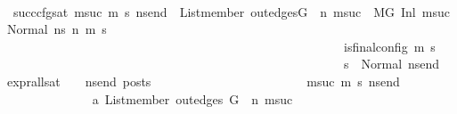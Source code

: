 \begin{isabellebody}
\isanewline
\ \ \ \ \ \ \ \ \ \ \isamarkupfalse%
\ succ{\isacharunderscore}{\kern0pt}cfg{\isacharunderscore}{\kern0pt}sat{\isacharcolon}{\kern0pt}\ {\isachardoublequoteopen}{\isasymAnd}msuc{}\ m{\isacharprime}{\kern0pt}\ s{\isacharprime}{\kern0pt}\ ns{\isacharunderscore}{\kern0pt}end{\isachardot}{\kern0pt}\ \ List{\isachardot}{\kern0pt}member\ {\isacharparenleft}{\kern0pt}out{\isacharunderscore}{\kern0pt}edges{\isacharparenleft}{\kern0pt}G{\isacharparenright}{\kern0pt}\ {\isacharbang}{\kern0pt}\ n{\isacharparenright}{\kern0pt}\ msuc{}\ {\isasymLongrightarrow}\ {\isacharparenleft}{\kern0pt}M{\isacharcomma}{\kern0pt}{\isasymLambda}{\isacharcomma}{\kern0pt}{\isasymGamma}{\isacharcomma}{\kern0pt}{\isasymOmega}{\isacharcomma}{\kern0pt}G\ {\isasymturnstile}{\isacharparenleft}{\kern0pt}Inl\ {\isacharparenleft}{\kern0pt}msuc{}{\isacharparenright}{\kern0pt}{\isacharcomma}{\kern0pt}\ Normal\ ns{}{\isacharparenright}{\kern0pt}\ {\isacharminus}{\kern0pt}n{\isasymrightarrow}{\isacharasterisk}{\kern0pt}\ {\isacharparenleft}{\kern0pt}m{\isacharprime}{\kern0pt}{\isacharcomma}{\kern0pt}\ s{\isacharprime}{\kern0pt}{\isacharparenright}{\kern0pt}{\isacharparenright}{\kern0pt}\ {\isasymLongrightarrow}\isanewline
\ \ \ \ \ \ \ \ \ \ \ \ \ \ \ \ \ \ \ \ \ \ \ \ \ \ \ \ \ \ \ \ \ \ \ \ \ \ \ \ \ \ \ \ \ \ \ \ \ \ \ \ \ \ is{\isacharunderscore}{\kern0pt}final{\isacharunderscore}{\kern0pt}config\ {\isacharparenleft}{\kern0pt}m{\isacharprime}{\kern0pt}{\isacharcomma}{\kern0pt}\ s{\isacharprime}{\kern0pt}{\isacharparenright}{\kern0pt}\ {\isasymLongrightarrow}\ \isanewline
\ \ \ \ \ \ \ \ \ \ \ \ \ \ \ \ \ \ \ \ \ \ \ \ \ \ \ \ \ \ \ \ \ \ \ \ \ \ \ \ \ \ \ \ \ \ \ \ \ \ \ \ \ \ {\isacharparenleft}{\kern0pt}s{\isacharprime}{\kern0pt}\ {\isacharequal}{\kern0pt}\ Normal\ ns{\isacharunderscore}{\kern0pt}end{\isacharparenright}{\kern0pt}\ {\isasymlongrightarrow}\ {\isacharparenleft}{\kern0pt}expr{\isacharunderscore}{\kern0pt}all{\isacharunderscore}{\kern0pt}sat\ {\isasymLambda}\ {\isasymGamma}\ {\isasymOmega}\ ns{\isacharunderscore}{\kern0pt}end{\isacharparenright}{\kern0pt}\ posts{\isachardoublequoteclose}\isanewline
\ \ \ \ \ \ \ \ \ \ \isamarkupfalse%
\isanewline
\ \ \ \ \ \ \ \ \ \ \ \ \isamarkupfalse%
\ msuc{}\ m{\isacharprime}{\kern0pt}\ s{\isacharprime}{\kern0pt}\ ns{\isacharunderscore}{\kern0pt}end\isanewline
\ \ \ \ \ \ \ \ \ \ \ \ \isamarkupfalse%
\ a{\isacharcolon}{\kern0pt}\ {\isachardoublequoteopen}List{\isachardot}{\kern0pt}member\ {\isacharparenleft}{\kern0pt}out{\isacharunderscore}{\kern0pt}edges\ G\ {\isacharbang}{\kern0pt}\ n{\isacharparenright}{\kern0pt}\ msuc{}{\isachardoublequoteclose}\ \isanewline

\end{isabellebody}
